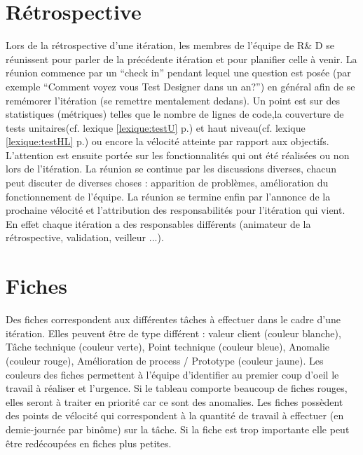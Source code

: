 \section{Rétrospective}
Lors de la rétrospective d'une itération, les membres de l'équipe de R\& D se réunissent pour parler de la précédente itération et pour planifier celle à venir. La réunion commence par un ``check in'' pendant lequel une question est posée (par exemple ``Comment voyez vous Test Designer dans un an?'') en général afin de se remémorer l'itération (se remettre mentalement dedans). Un point est sur des statistiques (métriques) telles que le nombre de lignes de code,la couverture de tests unitaires(cf. lexique \ref{lexique:testU} p.\pageref{lexique:testU}) et haut niveau(cf. lexique \ref{lexique:testHL} p.\pageref{lexique:testHL}) ou encore la vélocité atteinte par rapport aux objectifs. L'attention est ensuite portée sur les fonctionnalités qui ont été réalisées ou non lors de l'itération. La réunion se continue par les discussions diverses, chacun peut discuter de diverses choses : apparition de problèmes, amélioration du fonctionnement de l'équipe. La réunion se termine enfin par l'annonce de la prochaine vélocité et l'attribution des responsabilités pour l'itération qui vient. En effet chaque itération a des responsables différents (animateur de la rétrospective, validation, veilleur ...).

\section{Fiches}\label{agile:fiches}
Des fiches correspondent aux différentes tâches à effectuer dans le cadre d'une itération. Elles peuvent être de type différent : valeur client (couleur blanche), Tâche technique (couleur verte), Point technique (couleur bleue), Anomalie (couleur rouge), Amélioration de process / Prototype (couleur jaune). Les couleurs des fiches permettent à l'équipe d'identifier au premier coup d'oeil le travail à réaliser et l'urgence. Si le tableau comporte beaucoup de fiches rouges, elles seront à traiter en priorité car ce sont des anomalies. Les fiches possèdent des points de vélocité qui correspondent à la quantité de travail à effectuer (en demie-journée par binôme) sur la tâche. Si la fiche est trop importante elle peut être redécoupées en fiches plus petites.

